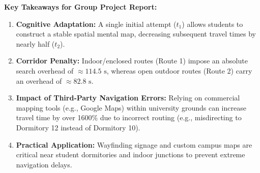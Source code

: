 \documentclass[11pt, a4paper]{article}
\begin{document}
\begin{tcolorbox}[colframe=primary, title=Project Integration Summary]
\textbf{Key Takeaways for Group Project Report:}
\begin{enumerate}
    \item \textbf{Cognitive Adaptation:} A single initial attempt ($t_1$) allows students to construct a stable spatial mental map, decreasing subsequent travel times by nearly half ($t_2$).
    \item \textbf{Corridor Penalty:} Indoor/enclosed routes (Route 1) impose an absolute search overhead of $\approx 114.5\text{ s}$, whereas open outdoor routes (Route 2) carry an overhead of $\approx 82.8\text{ s}$.
    \item \textbf{Impact of Third-Party Navigation Errors:} Relying on commercial mapping tools (e.g., Google Maps) within university grounds can increase travel time by over 1600\% due to incorrect routing (e.g., misdirecting to Dormitory 12 instead of Dormitory 10).
    \item \textbf{Practical Application:} Wayfinding signage and custom campus maps are critical near student dormitories and indoor junctions to prevent extreme navigation delays.
\end{enumerate}
\end{tcolorbox}
\end{document}
